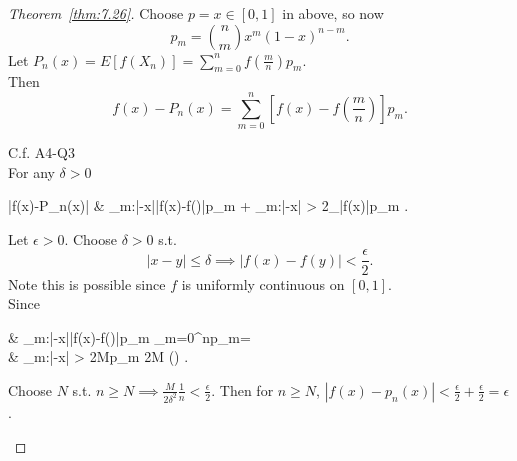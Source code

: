 \begin{proof}[Theorem~\ref{thm:7.26}]
	Choose $p=x \in [0,1]$ in above, so now \[
		p_m= \binom{n}{m}x^{m}(1-x)^{n-m}
		.\]
	Let $P_{n}(x)=E \left[ f(X_n)\right]=\sum_{m=0}^{n}{f(\frac{m}{n})p_m}$.\\
	Then \[
		f(x)-P_n(x)=\sum_{m=0}^{n}{\left[ f(x)-f(\frac{m}{n})\right]p_m}
		.\]
	\begin{remark}
		C.f. A4-Q3\\
		For any $\delta>0$
		\begin{flalign*}
			\left|f(x)-P_n(x)\right| & \le \sum_{m:\left|-x\right|\le \delta}{\left|f(x)-f()\right|p_m} + \sum_{m:\left|-x\right| > \delta}{2_{\sup\left|f(x)\right|}p_m}
			.\end{flalign*}
		Let $\epsilon>0$. Choose $\delta>0$ s.t. \[
			\left|x-y\right| \le \delta \implies \left|f(x)-f(y)\right|<\frac{\epsilon}{2}
			.\]
		Note this is possible since $f$ is uniformly continuous on $[0,1]$.\\
		Since
		\begin{flalign*}
			 & \sum_{m:\left|-x\right|\le \delta}{\left|f(x)-f()\right|p_m}  \le  {}	 \sum_{m=0}^{n}{p_m}=                                                                       \\
			 & \sum_{m:\left|-x\right| > \delta}{2Mp_m}                                 \le 2M  \le {}  \;\;(\because \text{Chebyshev's})
			.\end{flalign*}
		Choose $N$ s.t. $n\ge N\implies \frac{M}{2\delta^2}\frac{1}{n}<\frac{\epsilon}{2}$.
		Then for $n\ge N$, $\left|f(x)-p_n(x)\right|<\frac{\epsilon}{2}+\frac{\epsilon}{2}=\epsilon$.
	\end{remark}
\end{proof}


